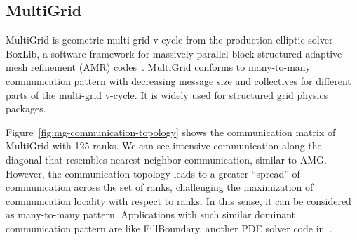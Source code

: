 \subsection{MultiGrid}
\label{sec:multigrid}


MultiGrid is geometric multi-grid v-cycle from the production elliptic solver BoxLib, 
a software framework for massively parallel block-structured adaptive mesh refinement (AMR) codes~\cite{boxlib}. 
MultiGrid conforms to many-to-many communication pattern with decreasing message size and 
collectives for different parts of the multi-grid v-cycle. 
It is widely used for structured grid physics packages. 

Figure~\ref{fig:mg-communication-topology} shows the communication matrix of MultiGrid with 125 ranks. 
We can see intensive communication along the diagonal that resembles nearest neighbor communication, similar to AMG. 
However, the communication topology leads to a greater ``spread'' of communication across the set of ranks, 
challenging the maximization of communication locality with respect to ranks. 
In this sense, it can be considered as many-to-many pattern. 
Applications with such similar dominant communication pattern are like FillBoundary, another PDE solver code in~\cite{boxlib}.


